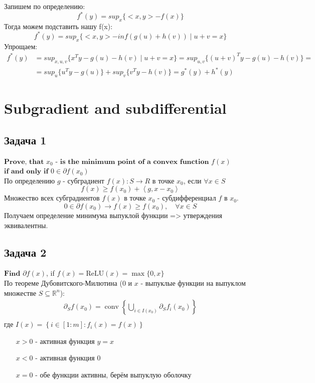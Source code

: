 \documentclass[12pt,letterpaper]{article}
\begin{document}
Запишем по определению:
$$f^*(y)= sup_x\{<x,y>-f(x)\}$$
Тогда можем подставить нашу f(x):
$$f^*(y)= sup_x\{<x,y>-inf(g(u)+h(v))\mid u+v = x\}$$
Упрощаем:
$$
\begin{aligned}
f^*(y)&= sup_{x,u,v}\{x^Ty-g(u)-h(v)\mid u+v=x\}=sup_{u,v}\{(u+v)^Ty-g(u)-h(v)\}=\\
&= sup_u\{u^Ty-g(u)\}+sup_v\{v^Ty-h(v)\}=g^*(y)+h^*(y)
\end{aligned}
$$


\newpage
\section{Subgradient and subdifferential}

\subsection*{Задача 1}
$\textbf{Prove, that}$ $x_0$ $\textbf{- is the minimum point of a convex function}$ $f(x)$ $\textbf{if and only if}$ $0 \in \partial f(x_0)$\\

По определению $ g $ - субградиент $ f(x) : S\rightarrow R $ в точке $ x_0 $, если $ \forall x \in S $
$$
f(x) \geq f\left(x_{0}\right)+\left\langle g, x-x_{0}\right\rangle
$$
Множество всех субградиентов $ f(x) $ в точке $ x_0 $ - субдифференциал $ f $ в $ x_0 $. 
$$ 0 \in \partial f(x_0) \longrightarrow f(x) \geq f\left(x_{0}\right), \quad \forall x \in S $$
Получаем определение минимума выпуклой функции => утверждения эквивалентны.

\subsection*{Задача 2}
$\textbf{Find}$ $\partial f(x)$, if $f(x) = \text{ReLU}(x) = \max \{0, x\}$\\

По теореме Дубовитского-Милютина ($ 0 $ и $ x $ - выпуклые функции на выпуклом множестве $S \subseteq \mathbb{R}^{n} $): 
$$
\begin{array}{r}
\partial_{S} f\left(x_{0}\right)=\operatorname{conv}\left\{\bigcup\limits_{i \in I\left(x_{0}\right)} \partial_{S} f_{i}\left(x_{0}\right)\right\} \\
\end{array}
$$
где $I(x)=\left\{i \in[1: m]: f_{i}(x)=f(x)\right\}$
\begin{itemize}
	\item[$ x > 0 $ ] - активная функция $ y = x $
	\item[$ x < 0 $] - активная функция $ 0 $
	\item[$ x = 0 $] - обе функции активны, берём выпуклую оболочку
\end{itemize}
\end{document}
